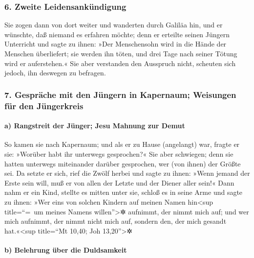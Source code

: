 \hypertarget{zweite-leidensankuxfcndigung}{%
\subsubsection{6. Zweite
Leidensankündigung}\label{zweite-leidensankuxfcndigung}}

 Sie zogen dann von dort weiter und wanderten durch
Galiläa hin, und er wünschte, daß niemand es erfahren möchte;
 denn er erteilte seinen Jüngern Unterricht und sagte zu
ihnen: »Der Menschensohn wird in die Hände der Menschen überliefert; sie
werden ihn töten, und drei Tage nach seiner Tötung wird er auferstehen.«
 Sie aber verstanden den Ausspruch nicht, scheuten sich
jedoch, ihn deswegen zu befragen.

\hypertarget{gespruxe4che-mit-den-juxfcngern-in-kapernaum-weisungen-fuxfcr-den-juxfcngerkreis}{%
\subsubsection{7. Gespräche mit den Jüngern in Kapernaum; Weisungen für
den
Jüngerkreis}\label{gespruxe4che-mit-den-juxfcngern-in-kapernaum-weisungen-fuxfcr-den-juxfcngerkreis}}

\hypertarget{a-rangstreit-der-juxfcnger-jesu-mahnung-zur-demut}{%
\paragraph{a) Rangstreit der Jünger; Jesu Mahnung zur
Demut}\label{a-rangstreit-der-juxfcnger-jesu-mahnung-zur-demut}}

 So kamen sie nach Kapernaum; und als er zu Hause
(angelangt) war, fragte er sie: »Worüber habt ihr unterwegs gesprochen?«
 Sie aber schwiegen; denn sie hatten unterwegs
miteinander darüber gesprochen, wer (von ihnen) der Größte sei.
 Da setzte er sich, rief die Zwölf herbei und sagte zu
ihnen: »Wenn jemand der Erste sein will, muß er von allen der Letzte und
der Diener aller sein!«  Dann nahm er ein Kind, stellte
es mitten unter sie, schloß es in seine Arme und sagte zu ihnen:
 »Wer eins von solchen Kindern auf meinen Namen
hin\textless sup title=``=~um meines Namens willen''\textgreater✲
aufnimmt, der nimmt mich auf; und wer mich aufnimmt, der nimmt nicht
mich auf, sondern den, der mich gesandt hat.«\textless sup title=``Mt
10,40; Joh 13,20''\textgreater✲

\hypertarget{b-belehrung-uxfcber-die-duldsamkeit}{%
\paragraph{b) Belehrung über die
Duldsamkeit}\label{b-belehrung-uxfcber-die-duldsamkeit}}

